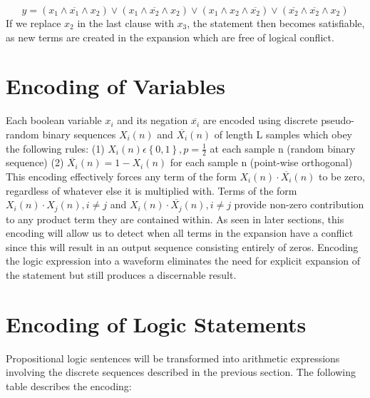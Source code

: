 \documentclass[reqno]{amsart}
\theoremstyle{definition}
\theoremstyle{remark}
\begin{document}
\begin{equation}
y = (x_1\wedge\overline{x_1}\wedge x_2) \vee (x_1 \wedge \overline{x_2} \wedge x_2) \vee (x_1\wedge x_2\wedge \overline{x_2} ) \vee (\overline{x_2}\wedge \overline{x_2}\wedge x_2)
\end{equation}
\newline
\noindent
If we replace $x_2$ in the last clause with $x_3$, the statement then becomes satisfiable, as new terms are created in the expansion which are free of logical conflict.


\section{Encoding of Variables}
\noindent
Each boolean variable $x_i$ and its negation $\overline{x_i}$ are encoded using discrete pseudo-random binary 
sequences $X_i(n)$ and $\overline{X_i}(n)$ of length L samples which obey the following
rules: \newline\newline
(1) $X_i(n) \epsilon\left \{ 0,1 \right \}, p=\frac{1}{2}$ at each sample n (random binary sequence) \newline
(2) $\overline{X_i}(n) =  1-X_i(n)$  for each sample n (point-wise orthogonal) \newline
\newline
\noindent
This encoding effectively forces any term of the form $X_i(n) \cdot \overline{X_i}(n)$ to be zero, regardless
of whatever else it is multiplied with. Terms of the form $X_i(n) \cdot X_j(n), i \neq j$ and 
$X_i(n) \cdot \overline{X_j}(n), i \neq j$ provide non-zero contribution to any product term they are contained within.
As seen in later sections, this encoding will allow us to detect when all terms in the expansion have a conflict since this will result in an output sequence consisting entirely of zeros. Encoding the logic expression into a waveform eliminates the need for explicit 
expansion of the statement but still produces a discernable result.
\newline


\section{Encoding of Logic Statements}
\noindent
Propositional logic sentences will be transformed into arithmetic expressions involving the discrete sequences
described in the previous section. The following table describes the encoding:
\end{document}
